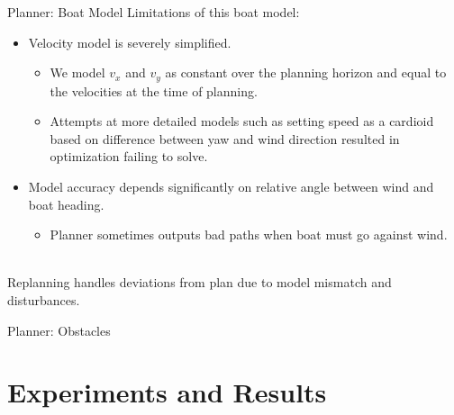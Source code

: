 \documentclass[10pt,xcolor={table,dvipsnames},t]{beamer}
\begin{document}
\begin{frame}{Planner: Boat Model}
    Limitations of this boat model:
    \begin{itemize}
        \item Velocity model is severely simplified.
            \begin{itemize}
                \item We model \(v_x\) and \(v_y\) as constant over the planning horizon and equal to the velocities at the time of planning.
                \item Attempts at more detailed models such as setting speed as a cardioid based on difference between yaw and wind direction resulted in optimization failing to solve.
            \end{itemize}
        \item Model accuracy depends significantly on relative angle between wind and boat heading.
        \begin{itemize}
            \item Planner sometimes outputs bad paths when boat must go against wind.
        \end{itemize}
    \end{itemize}
    
    \hfill\\
    Replanning handles deviations from plan due to model mismatch and disturbances.
\end{frame}

\begin{frame}{Planner: Obstacles}

\end{frame}

\section{Experiments and Results}
\end{document}

